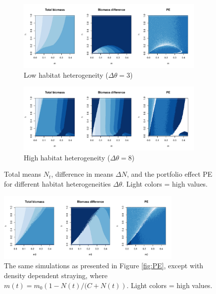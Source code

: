 \documentclass[twocolumn,preprintnumbers,amsmath,amssymb,superscriptaddress]{revtex4}
\begin{document}
\begin{figure}[h!]
\centering
\begin{subfigure}[t]{0.55\textwidth}
\centering
\includegraphics[width=\textwidth]{figs/fig_MDPE_hm_theta3.pdf} 
\caption{Low habitat heterogeneity ($\Delta\theta=3$)} \label{fig:thetadiff1}
\end{subfigure}
\begin{subfigure}[t]{0.55\textwidth}
\centering
\includegraphics[width=\textwidth]{figs/fig_MDPE_hm_theta8.pdf} 
\caption{High habitat heterogeneity ($\Delta\theta=8$)} \label{fig:thetadiff2}
\end{subfigure}
\caption{Total means $N_t$, difference in means $\Delta N$, and the portfolio effect PE for different habitat heterogeneities $\Delta\theta$. Light colors = high values.
}
\end{figure}


\begin{figure}[h!]
\centering
\includegraphics[width=0.8\textwidth]{figs/fig_MDPE_hm_ddm.pdf}
\caption{
The same simulations as presented in Figure \ref{fig:PE}, except with density dependent straying, where $m(t) = m_0\left(1-N(t)/(C+N(t)\right)$. Light colors = high values.
} \label{fig:ddm}
\end{figure}
\end{document}
